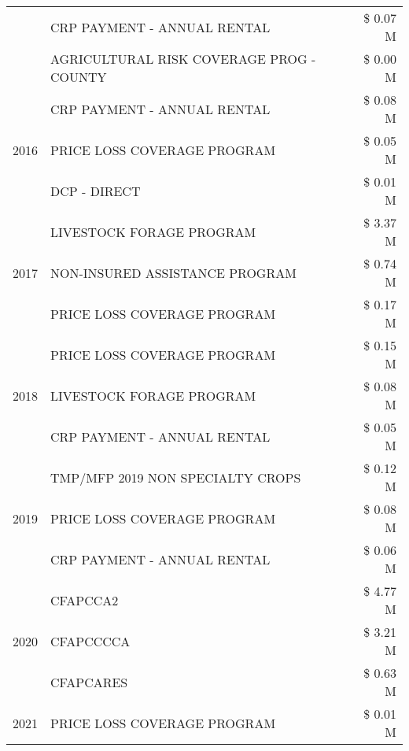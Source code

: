 \begin{tabular}{llr}
 & CRP PAYMENT - ANNUAL RENTAL & \$ 0.07 M \\
 & AGRICULTURAL RISK COVERAGE PROG - COUNTY & \$ 0.00 M \\
\cline{1-3}
\multirow[t]{3}{*}{2016} & CRP PAYMENT - ANNUAL RENTAL                   & \$ 0.08 M \\
 & PRICE LOSS COVERAGE PROGRAM                   & \$ 0.05 M \\
 & DCP - DIRECT                                  & \$ 0.01 M \\
\cline{1-3}
\multirow[t]{3}{*}{2017} & LIVESTOCK FORAGE PROGRAM & \$ 3.37 M \\
 & NON-INSURED ASSISTANCE PROGRAM & \$ 0.74 M \\
 & PRICE LOSS COVERAGE PROGRAM & \$ 0.17 M \\
\cline{1-3}
\multirow[t]{3}{*}{2018} & PRICE LOSS COVERAGE PROGRAM & \$ 0.15 M \\
 & LIVESTOCK FORAGE PROGRAM & \$ 0.08 M \\
 & CRP PAYMENT - ANNUAL RENTAL & \$ 0.05 M \\
\cline{1-3}
\multirow[t]{3}{*}{2019} & TMP/MFP 2019 NON SPECIALTY CROPS & \$ 0.12 M \\
 & PRICE LOSS COVERAGE PROGRAM & \$ 0.08 M \\
 & CRP PAYMENT - ANNUAL RENTAL & \$ 0.06 M \\
\cline{1-3}
\multirow[t]{3}{*}{2020} & CFAPCCA2 & \$ 4.77 M \\
 & CFAPCCCCA & \$ 3.21 M \\
 & CFAPCARES & \$ 0.63 M \\
\cline{1-3}
2021 & PRICE LOSS COVERAGE PROGRAM & \$ 0.01 M \\
\cline{1-3}
\bottomrule
\end{tabular}
